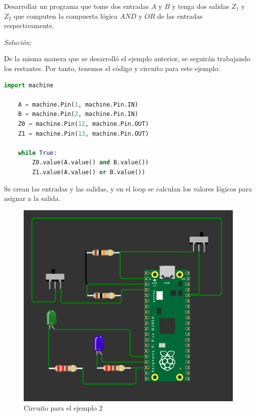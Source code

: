 \documentclass{article}
\begin{document}
    Desarrollar un programa que tome dos entradas $A$ y $B$ y tenga dos
    salidas $Z_1$ y $Z_2$ que computen la compuerta lógica $AND$ y $OR$ de
    las entradas respectivamente.

    \bigbreak

    \textit{Solución:}

    \bigbreak

    De la misma manera que se desarrolló el ejemplo anterior, se seguirán
    trabajando los restantes. Por tanto, tenemos el código y circuito para
    este ejemplo:

    \begin{lstlisting}[language=Python, caption={Programa para el ejemplo 2}]
    import machine

    A = machine.Pin(1, machine.Pin.IN)
    B = machine.Pin(2, machine.Pin.IN)
    Z0 = machine.Pin(12, machine.Pin.OUT)
    Z1 = machine.Pin(13, machine.Pin.OUT)

    while True:
        Z0.value(A.value() and B.value())
        Z1.value(A.value() or B.value())
    \end{lstlisting}

    Se crean las entradas y las salidas, y en el loop se calculan los valores
    lógicos para asignar a la salida.

    \begin{figure}[H]
        \centering
        \includegraphics[width=0.5\paperwidth]{images/wokwi-example-2-circuit}
        \caption{Circuito para el ejemplo 2}
    \end{figure}
\end{document}

